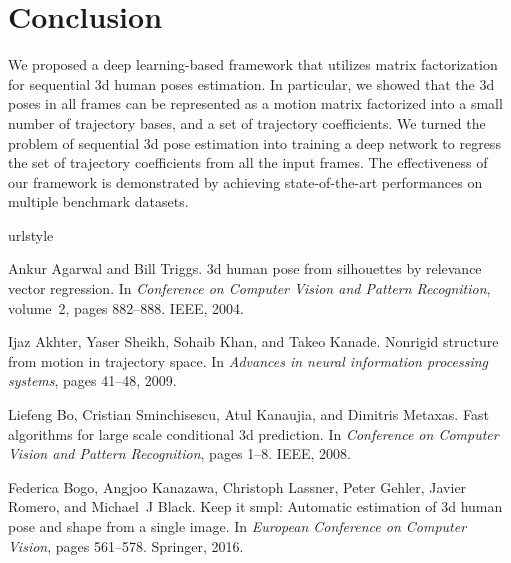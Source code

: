\documentclass{bmvc2k}
\begin{document}
\section{Conclusion}
\label{sec:conclusion}
We proposed a deep learning-based framework that utilizes matrix factorization for sequential 3d human poses estimation. In particular, we showed that the 3d poses in all frames can be represented as a motion matrix factorized into a small number of trajectory bases, and a set of trajectory coefficients. We turned the problem of sequential 3d pose estimation into training a deep network to regress the set of trajectory coefficients from all the input frames. The effectiveness of our framework is demonstrated by achieving state-of-the-art performances on multiple benchmark datasets.


\begin{thebibliography}{42}
\providecommand{\natexlab}[1]{#1}
\providecommand{\url}[1]{\texttt{#1}}
\expandafter\ifx\csname urlstyle\endcsname\relax
  \providecommand{\doi}[1]{doi: #1}\else
  \providecommand{\doi}{doi: \begingroup \urlstyle{rm}\Url}\fi

Ankur Agarwal and Bill Triggs.
\newblock 3d human pose from silhouettes by relevance vector regression.
\newblock In \emph{Conference on Computer Vision and Pattern Recognition},
  volume~2, pages 882--888. IEEE, 2004.

Ijaz Akhter, Yaser Sheikh, Sohaib Khan, and Takeo Kanade.
\newblock Nonrigid structure from motion in trajectory space.
\newblock In \emph{Advances in neural information processing systems}, pages
  41--48, 2009.

Liefeng Bo, Cristian Sminchisescu, Atul Kanaujia, and Dimitris Metaxas.
\newblock Fast algorithms for large scale conditional 3d prediction.
\newblock In \emph{Conference on Computer Vision and Pattern Recognition},
  pages 1--8. IEEE, 2008.

Federica Bogo, Angjoo Kanazawa, Christoph Lassner, Peter Gehler, Javier Romero,
  and Michael~J Black.
\newblock Keep it smpl: Automatic estimation of 3d human pose and shape from a
  single image.
\newblock In \emph{European Conference on Computer Vision}, pages 561--578.
  Springer, 2016.


\end{thebibliography}
\end{document}
